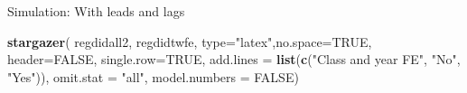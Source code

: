 \documentclass[
  ignorenonframetext,
]{beamer}
\newenvironment{Shaded}{\begin{snugshade}}{\end{snugshade}}
\newcommand{\AttributeTok}[1]{\textcolor[rgb]{0.13,0.29,0.53}{#1}}
\newcommand{\ConstantTok}[1]{\textcolor[rgb]{0.56,0.35,0.01}{#1}}
\newcommand{\FunctionTok}[1]{\textcolor[rgb]{0.13,0.29,0.53}{\textbf{#1}}}
\newcommand{\NormalTok}[1]{#1}
\newcommand{\StringTok}[1]{\textcolor[rgb]{0.31,0.60,0.02}{#1}}
\begin{document}
\begin{frame}[fragile]{Simulation: With leads and lags}
\protect\hypertarget{simulation-with-leads-and-lags-3}{}
\tiny

\begin{Shaded}
\begin{Highlighting}[]
\FunctionTok{stargazer}\NormalTok{( regdidall2, regdidtwfe, }\AttributeTok{type=}\StringTok{"latex"}\NormalTok{,}\AttributeTok{no.space=}\ConstantTok{TRUE}\NormalTok{, }\AttributeTok{header=}\ConstantTok{FALSE}\NormalTok{, }
           \AttributeTok{single.row=}\ConstantTok{TRUE}\NormalTok{, }\AttributeTok{add.lines =} \FunctionTok{list}\NormalTok{(}\FunctionTok{c}\NormalTok{(}\StringTok{"Class and year FE"}\NormalTok{, }\StringTok{"No"}\NormalTok{,  }\StringTok{"Yes"}\NormalTok{)), }\AttributeTok{omit.stat =} \StringTok{"all"}\NormalTok{,  }\AttributeTok{model.numbers          =} \ConstantTok{FALSE}\NormalTok{)}
\end{Highlighting}
\end{Shaded}


\end{frame}
\end{document}
